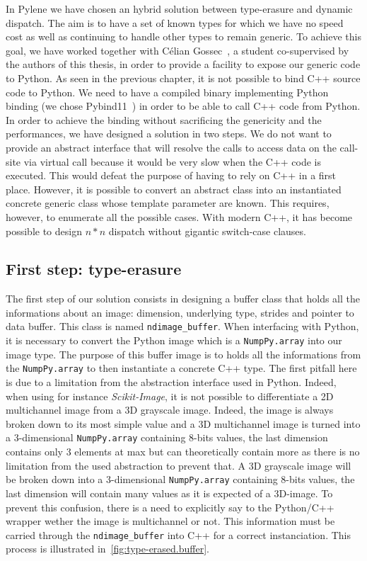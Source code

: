 In Pylene we have chosen an hybrid solution between type-erasure and dynamic dispatch. The aim is to have a set of known
types for which we have no speed cost as well as continuing to handle other types to remain generic. To achieve this
goal, we have worked together with Célian Gossec~\cite{gossec.2019.pybind}, a student co-supervised by the authors of
this thesis, in order to provide a facility to expose our generic code to Python. As seen in the previous chapter, it is
not possible to bind C++ source code to Python. We need to have a compiled binary implementing Python binding (we chose
Pybind11~\parencite{jakob.2017.pybind11}) in order to be able to call C++ code from Python. In order to achieve the
binding without sacrificing the genericity and the performances, we have designed a solution in two steps. We do not
want to provide an abstract interface that will resolve the calls to access data on the call-site via virtual call
because it would be very slow when the C++ code is executed. This would defeat the purpose of having to rely on C++ in a
first place. However, it is possible to convert an abstract class into an instantiated concrete generic class whose
template parameter are known. This requires, however, to enumerate all the possible cases. With modern C++, it has
become possible to design $n*n$ dispatch without gigantic switch-case clauses.

\subsection{First step: type-erasure}

The first step of our solution consists in designing a buffer class that holds all the informations about an image:
dimension, underlying type, strides and pointer to data buffer. This class is named \texttt{ndimage\_buffer}. When
interfacing with Python, it is necessary to convert the Python image which is a \texttt{NumpPy.array} into our image
type. The purpose of this buffer image is to holds all the informations from the \texttt{NumpPy.array} to then
instantiate a concrete C++ type. The first pitfall here is due to a limitation from the abstraction interface used in
Python. Indeed, when using for instance \emph{Scikit-Image}, it is not possible to differentiate a 2D multichannel image
from a 3D grayscale image. Indeed, the image is always broken down to its most simple value and a 3D multichannel image
is turned into a 3-dimensional \texttt{NumpPy.array} containing 8-bits values, the last dimension contains only 3
elements at max but can theoretically contain more as there is no limitation from the used abstraction to prevent that.
A 3D grayscale image will be broken down into a 3-dimensional \texttt{NumpPy.array} containing 8-bits values, the last
dimension will contain many values as it is expected of a 3D-image. To prevent this confusion, there is a need to
explicitly say to the Python/C++ wrapper wether the image is multichannel or not. This information must be carried
through the \texttt{ndimage\_buffer} into C++ for a correct instanciation. This process is illustrated
in~\cref{fig:type-erased.buffer}.


